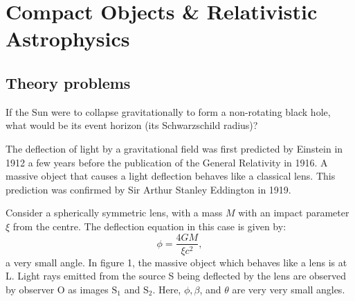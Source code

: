 \chapter{Compact Objects \& Relativistic Astrophysics}

\section*{Theory problems}

If the Sun were to collapse gravitationally to form a non-rotating black hole,
what would be its event horizon (its Schwarzschild radius)?


The deflection of light by a gravitational field was first predicted by
Einstein in 1912 a few years before the publication of the General Relativity
in 1916. A massive object that causes a light deflection behaves like a
classical lens. This prediction was confirmed by Sir Arthur Stanley Eddington
in 1919.


Consider a spherically symmetric lens, with a mass $M$ with an impact
parameter $\xi$ from the centre. The deflection equation in this case is given
by:
\[ \phi = \frac{4GM}{\xi c^2}, \]
a very small angle. In figure 1, the massive object which behaves like a lens
is at L. Light rays emitted from the source S being deflected by the lens are
observed by observer O as images $\mathrm{S}_1$ and $\mathrm{S}_2$. Here,
$\phi, \beta$, and $\theta$ are very very small angles.

